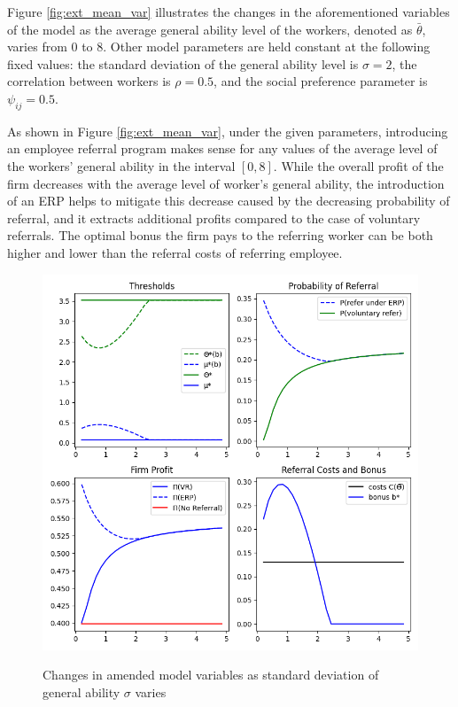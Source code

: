 \documentclass[12pt]{article}
\begin{document}
Figure \ref{fig:ext_mean_var} illustrates the changes in the aforementioned variables of the model as the average general ability level of the workers, denoted as $\bar{\theta}$, varies from 0 to 8. Other model parameters are held constant at the following fixed values: the standard deviation of the general ability level is $\sigma = 2$, the correlation between workers is $\rho = 0.5$, and the social preference parameter is $\psi_{ij} = 0.5$.

As shown in Figure \ref{fig:ext_mean_var}, under the given parameters, introducing an employee referral program makes sense for any values of the average level of the workers' general ability in the interval $[0, 8]$. While the overall profit of the firm decreases with the average level of worker's general ability, the introduction of an ERP helps to mitigate this decrease caused by the decreasing probability of referral, and it extracts additional profits compared to the case of voluntary referrals. The optimal bonus the firm pays to the referring worker can be both higher and lower than the referral costs of referring employee.

\begin{figure}[ht]
    \caption{Changes in amended model variables as standard deviation of general ability $\sigma$ varies}
    \includegraphics[width=12cm]{images/perf_st_dev_var.png}
    \centering
    \label{fig:ext_st_dev_var}
\end{figure}
\end{document}
